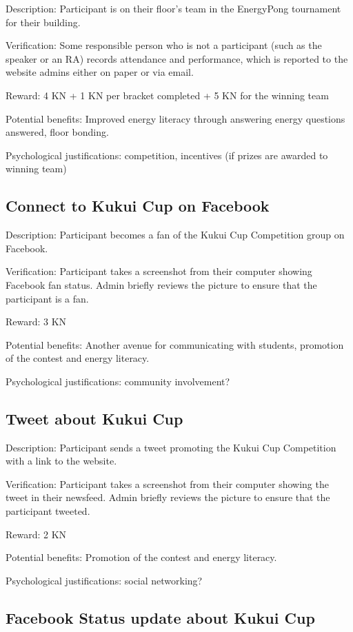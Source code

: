 Description: Participant is on their floor's team in the EnergyPong tournament for their building.

Verification: Some responsible person who is not a participant (such as the speaker or an RA) records attendance and performance, which is reported to the website admins either on paper or via email.

Reward: 4 KN + 1 KN per bracket completed + 5 KN for the winning team

Potential benefits: Improved energy literacy through answering energy questions answered, floor bonding.

Psychological justifications: competition, incentives (if prizes are awarded to winning team)

\subsection{Connect to Kukui Cup on Facebook}

Description: Participant becomes a fan of the Kukui Cup Competition group on Facebook.

Verification: Participant takes a screenshot from their computer showing Facebook fan status. Admin briefly reviews the picture to ensure that the participant is a fan.

Reward: 3 KN

Potential benefits: Another avenue for communicating with students, promotion of the contest and energy literacy.

Psychological justifications: community involvement?

\subsection{Tweet about Kukui Cup}

Description: Participant sends a tweet promoting the Kukui Cup Competition with a link to the website.

Verification: Participant takes a screenshot from their computer showing the tweet in their newsfeed. Admin briefly reviews the picture to ensure that the participant tweeted.

Reward: 2 KN

Potential benefits: Promotion of the contest and energy literacy.

Psychological justifications: social networking?

\subsection{Facebook Status update about Kukui Cup}

